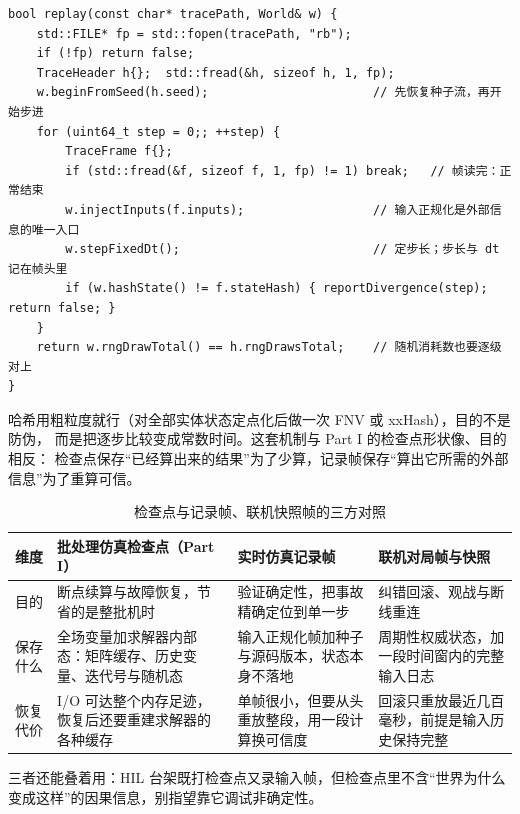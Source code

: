 \documentclass[12pt,a4paper,fontset=fandol]{ctexbook}
\begin{document}
\begin{lstlisting}[style=cppstyle, caption={回放端：只吃帧文件与种子，第一条分歧步就是事故现场}, label={lst:ch15-replay}]
bool replay(const char* tracePath, World& w) {
    std::FILE* fp = std::fopen(tracePath, "rb");
    if (!fp) return false;
    TraceHeader h{};  std::fread(&h, sizeof h, 1, fp);
    w.beginFromSeed(h.seed);                       // 先恢复种子流，再开始步进
    for (uint64_t step = 0;; ++step) {
        TraceFrame f{};
        if (std::fread(&f, sizeof f, 1, fp) != 1) break;   // 帧读完：正常结束
        w.injectInputs(f.inputs);                  // 输入正规化是外部信息的唯一入口
        w.stepFixedDt();                           // 定步长；步长与 dt 记在帧头里
        if (w.hashState() != f.stateHash) { reportDivergence(step); return false; }
    }
    return w.rngDrawTotal() == h.rngDrawsTotal;    // 随机消耗数也要逐级对上
}
\end{lstlisting}

哈希用粗粒度就行（对全部实体状态定点化后做一次 FNV 或 xxHash），目的不是防伪，
而是把逐步比较变成常数时间。这套机制与 Part I 的检查点形状像、目的相反：
检查点保存``已经算出来的结果''为了少算，记录帧保存``算出它所需的外部信息''为了重算可信。

\begin{table}[htbp]
\centering
\caption{检查点与记录帧、联机快照帧的三方对照}
\label{tab:ch15-checkpoint}
\begin{tabular}{>{\raggedright\arraybackslash}p{} >{\raggedright\arraybackslash}p{} >{\raggedright\arraybackslash}p{} >{\raggedright\arraybackslash}p{}}
\toprule
维度 & 批处理仿真检查点（Part I） & 实时仿真记录帧 & 联机对局帧与快照 \\
\midrule
目的 & 断点续算与故障恢复，节省的是整批机时 & 验证确定性，把事故精确定位到单一步 & 纠错回滚、观战与断线重连 \\
保存什么 & 全场变量加求解器内部态：矩阵缓存、历史变量、迭代号与随机态 & 输入正规化帧加种子与源码版本，状态本身不落地 & 周期性权威状态，加一段时间窗内的完整输入日志 \\
恢复代价 & I/O 可达整个内存足迹，恢复后还要重建求解器的各种缓存 & 单帧很小，但要从头重放整段，用一段计算换可信度 & 回滚只重放最近几百毫秒，前提是输入历史保持完整 \\
\bottomrule
\end{tabular}
\end{table}

三者还能叠着用：HIL 台架既打检查点又录输入帧，但检查点里不含``世界为什么变成这样''的因果信息，别指望靠它调试非确定性。
\end{document}
